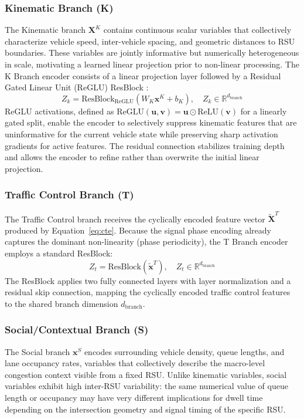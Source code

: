 \documentclass[journal]{IEEEtran}
\begin{document}
\subsubsection{Kinematic Branch (K)}
The Kinematic branch $\mathbf{X}^K$ contains continuous scalar variables that collectively characterize vehicle speed, inter-vehicle spacing, and geometric distances to RSU boundaries.
These variables are jointly informative but numerically heterogeneous in scale, motivating a learned linear projection prior to non-linear processing.
The K Branch encoder consists of a linear projection layer followed by a Residual Gated Linear Unit (ReGLU) ResBlock \cite{Shazeer2020GLU}:
\begin{equation}
    Z_k = \text{ResBlock}_\text{ReGLU}\!\left(W_K \mathbf{x}^K + b_K\right), \quad Z_k \in \mathbb{R}^{d_\text{branch}}
    \label{eq:zk}
\end{equation}
ReGLU activations, defined as $\text{ReGLU}(\mathbf{u}, \mathbf{v}) = \mathbf{u} \odot \text{ReLU}(\mathbf{v})$ for a linearly gated split, enable the encoder to selectively suppress kinematic features that are uninformative for the current vehicle state while preserving sharp activation gradients for active features.
The residual connection stabilizes training depth and allows the encoder to refine rather than overwrite the initial linear projection.

\subsubsection{Traffic Control Branch (T)}
The Traffic Control branch receives the cyclically encoded feature vector $\tilde{\mathbf{X}}^T$ produced by Equation~\eqref{eq:cte}.
Because the signal phase encoding already captures the dominant non-linearity (phase periodicity), the T Branch encoder employs a standard ResBlock:
\begin{equation}
    Z_t = \text{ResBlock}\!\left(\tilde{\mathbf{x}}^T\right), \quad Z_t \in \mathbb{R}^{d_\text{branch}}
    \label{eq:zt}
\end{equation}
The ResBlock applies two fully connected layers with layer normalization and a residual skip connection, mapping the cyclically encoded traffic control features to the shared branch dimension $d_\text{branch}$.

\subsubsection{Social/Contextual Branch (S)}
The Social branch $\mathbf{x}^S$ encodes surrounding vehicle density, queue lengths, and lane occupancy rates, variables that collectively describe the macro-level congestion context visible from a fixed RSU.
Unlike kinematic variables, social variables exhibit high inter-RSU variability: the same numerical value of queue length or occupancy may have very different implications for dwell time depending on the intersection geometry and signal timing of the specific RSU.
\end{document}
